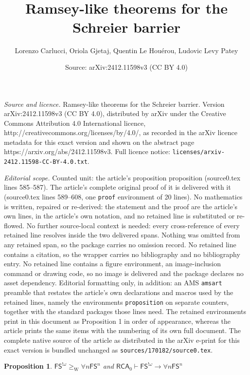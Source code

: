 \documentclass[10pt,a4paper]{amsart}
\title{Ramsey-like theorems for the Schreier barrier}
\author{Lorenzo Carlucci, Oriola Gjetaj, Quentin Le Hou\'erou, Ludovic Levy Patey}
\date{Source: arXiv:2412.11598v3 (CC BY 4.0)}
\newtheorem{proposition}{Proposition}
\newcommand{\FS}[0]{\mathsf{FS}}
\newcommand{\RCA}[0]{\mathsf{RCA}}
\newcommand{\W}{\mathrm{W}}
\begin{document}
\maketitle

\noindent\emph{Source and licence.} Ramsey-like theorems for the Schreier barrier. Version arXiv:2412.11598v3 (CC BY 4.0), distributed by arXiv under the Creative Commons Attribution 4.0 International licence, http://creativecommons.org/licenses/by/4.0/, as recorded in the arXiv licence metadata for this exact version and shown on the abstract page https://arxiv.org/abs/2412.11598v3. Full licence notice: \texttt{licenses/arxiv-2412.11598-CC-BY-4.0.txt}.\par\smallskip

\noindent\textit{Editorial scope.} Counted unit: the article's proposition proposition (source0.tex lines 585--587). The article's complete original proof of it is delivered with it (source0.tex lines 589--608, one \texttt{proof} environment of 20 lines). No mathematics is written, repaired or re-derived: the statement and the proof are the article's own lines, in the article's own notation, and no retained line is substituted or re-flowed.  No further source-local context is needed: every cross-reference of every retained line resolves inside the two delivered spans.  Nothing was omitted from any retained span, so the package carries no omission record.  No retained line contains a citation, so the wrapper carries no bibliography and no bibliography entry.  No retained line contains a figure environment, an image-inclusion command or drawing code, so no image is delivered and the package declares no asset dependency.  Editorial formatting only, in addition: an AMS \texttt{amsart} preamble that restates the article's own declarations and macros used by the retained lines, namely the environments \texttt{proposition} on separate counters, together with the standard packages those lines need.  The retained environments print in this document as Proposition 1 in order of appearance, whereas the article prints the same items with the numbering of its own full document.  The complete native source of the article as distributed in the arXiv e-print for this exact version is bundled unchanged as \texttt{sources/170182/source0.tex}.
\begin{proposition}
$\FS^{!\omega} \geq_{\W} \forall n \FS^n$ and $\RCA_0\vdash \FS^{!\omega} \to \forall n \FS^n$
\end{proposition}
\end{document}
